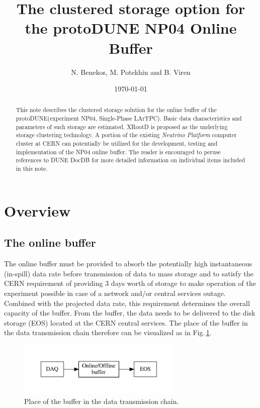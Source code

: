 \documentclass[pdftex,12pt,letter]{article}
\title{The clustered storage option for the protoDUNE NP04 Online Buffer}
\date{\today}
\author{N. Benekos, M. Potekhin and B. Viren}
\newcommand{\pd}{protoDUNE\xspace}
\newcommand{\xrd}{XRootD\xspace}
\begin{document}
\maketitle

\begin{abstract}
\noindent  This note describes the clustered storage
solution for the online buffer of the \pd (experiment NP04, Single-Phase LArTPC).
Basic data characteristics and  parameters of such storage are estimated. \xrd is proposed as the underlying
storage clustering technology. A portion of the existing   \textit{Neutrino Platform} computer cluster at CERN
can potentially be utilized for the development, testing and  implementation of the NP04 online buffer.  The reader
is encouraged to peruse  references to DUNE DocDB for more detailed information on individual
items included in this note.
\end{abstract}

\section{Overview}
\subsection{The online buffer}
The online buffer must be provided to absorb the potentially high instantaneous (in-spill) data rate before transmission
of data to mass storage and to satisfy the CERN requirement of providing 3 days worth of storage to make operation
of the experiment possible in case of a network and/or central services outage. Combined with the projected data
rate, this requirement determines the overall capacity of the buffer. From the buffer, the data needs to be delivered to
the disk storage (EOS) located at the CERN central services.
The place of the buffer in the data transmission chain therefore can be visualized as in Fig.\,\ref{fig:big-picture}.
\begin{figure}[tbh]
  \centering
  \includegraphics[width=0.7\textwidth]{figures/big-picture.pdf}
  \caption{Place of the buffer in the data transmission chain.}
  \label{fig:big-picture}
\end{figure}
\end{document}
